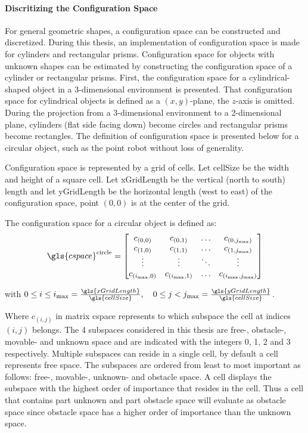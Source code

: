 \paragraph{Discritizing the Configuration Space}
For general geometric shapes, a configuration space can be constructed and discretized. During this thesis, an implementation of configuration space is made for cylinders and rectangular prisms. Configuration space for objects with unknown shapes can be estimated by constructing the configuration space of a cylinder or rectangular prisms. First, the configuration space for a cylindrical-shaped object in a 3-dimensional environment is presented. That configuration space for cylindrical objects is defined as a $(x, y)$-plane, the $z$-axis is omitted. During the projection from a 3-dimensional environment to a 2-dimensional plane, cylinders (flat side facing down) become circles and rectangular prisms become rectangles. The definition of configuration space is presented below for a circular object, such as the point robot without loss of generality.\bs

Configuration space is represented by a grid of cells. Let \gls{cellSize} be the width and height of a square cell. Let \gls{xGridLength} be the vertical (north to south) length and let \gls{yGridLength} be the horizontal length (west to east) of the configuration space, point $(0, 0)$ is at the center of the grid.\bs

The configuration space for a circular object is defined as:\bs
\[ \gls{cspace}^{\textrm{circle}} = 
\begin{bmatrix}
  c_{(0,0)} & c_{(0,1)} & \hdots & c_{(0,j_{\textrm{max}})}\\
  c_{(1,0)} & c_{(1,1)} & \hdots & c_{(1,j_{\textrm{max}})}\\
  \vdots &  \vdots & \ddots & \vdots\\
  c_{(i_{\textrm{max}},0)} & c_{(i_{\textrm{max}},1)} & \hdots & c_{(i_{\textrm{max}},j_{\textrm{max}})}\\
\end{bmatrix}
\]

with $0 \leq i \leq i_{\textrm{max}} = \frac{\gls{xGridLength}}{\gls{cellSize}}, \quad 0 \leq j < j_{\textrm{max}} = \frac{\gls{yGridLength}}{\gls{cellSize}}$.\bs

Where $c_{(i,j)}$ in matrix \gls{cspace} represents to which subspace the cell at indices $(i, j)$ belongs. The 4 subspaces considered in this thesis are free-, obstacle-, movable- and unknown space and are indicated with the integers 0, 1, 2 and 3 respectively. Multiple subspaces can reside in a single cell, by default a cell represents free space. The subspaces are ordered from least to most important as follows: free-, movable-, unknown- and obstacle space. A cell displays the subspace with the highest order of importance that resides in the cell. Thus a cell that contains part unknown and part obstacle space will evaluate as obstacle space since obstacle space has a higher order of importance than the unknown space.\bs

